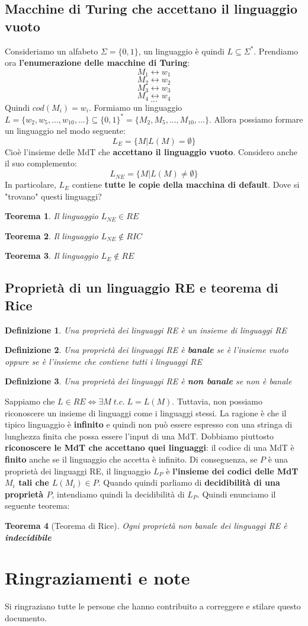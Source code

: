 \documentclass[12pt]{article}
\newtheorem{Definizione}{Definizione}[subsection]
\newtheorem{Teorema}{Teorema}[subsection]
\begin{document}
\subsection{Macchine di Turing che accettano il linguaggio vuoto}
Consideriamo un alfabeto $\Sigma = \{0, 1\}$, un linguaggio è quindi $L \subseteq \Sigma^*$. Prendiamo ora \textbf{l'enumerazione delle macchine di Turing}:
$$M_1 \leftrightarrow w_1$$
$$M_2 \leftrightarrow w_2$$
$$M_3 \leftrightarrow w_3$$
$$M_4 \leftrightarrow w_4$$
$$...$$
Quindi $cod(M_i) = w_i$. Formiamo un linguaggio $L = \{w_2, w_5, ..., w_10, ...\} \subseteq \{0, 1\}^* = \{M_2, M_5, ..., M_10, ...\}$. Allora possiamo formare un linguaggio nel modo seguente:
$$L_E = \{M|L(M) = \emptyset\}$$
Cioè l'insieme delle MdT che \textbf{accettano il linguaggio vuoto}. Considero anche il suo complemento:
$$L_{NE} = \{M|L(M) \neq \emptyset\}$$
In particolare, $L_E$ contiene \textbf{tutte le copie della macchina di default}. Dove si "trovano" questi linguaggi?
\begin{Teorema}
    Il linguaggio $L_{NE} \in RE$
\end{Teorema}
\begin{Teorema}
    Il linguaggio $L_{NE} \not \in RIC$
\end{Teorema}
\begin{Teorema}
    Il linguaggio $L_E \not\in RE$
\end{Teorema}
\subsection{Proprietà di un linguaggio RE e teorema di Rice}
\begin{Definizione}
    Una proprietà dei linguaggi RE è un insieme di linguaggi RE
\end{Definizione}
\begin{Definizione}
    Una proprietà dei linguaggi RE è \textbf{banale} se è l'insieme vuoto oppure se è l'insieme che contiene tutti i linguaggi RE
\end{Definizione}
\begin{Definizione}
    Una proprietà dei linguaggi RE è \textbf{non banale} se non è banale
\end{Definizione}
Sappiamo che $L \in RE \Leftrightarrow \exists M \; t.c. \; L = L(M)$. Tuttavia, non possiamo riconoscere un insieme di linguaggi come i linguaggi stessi. La ragione è che il tipico linguaggio è \textbf{infinito} e quindi non può essere espresso con una stringa di lunghezza finita che possa essere l'input di una MdT. Dobbiamo piuttosto \textbf{riconoscere le MdT che accettano quei linguaggi}: il codice di una MdT è \textbf{finito} anche se il linguaggio che accetta è infinito. Di conseguenza, se $P$ è una proprietà dei linguaggi RE, il linguaggio $L_P$ è \textbf{l'insieme dei codici delle MdT $M_i$ tali che $L(M_i) \in P$}. Quando quindi parliamo di \textbf{decidibilità di una proprietà $P$}, intendiamo quindi la decidibilità di $L_P$. Quindi enunciamo il seguente teorema:
\begin{Teorema}[Teorema di Rice]
Ogni proprietà non banale dei linguaggi RE è \textbf{indecidibile}
\end{Teorema}
\section{Ringraziamenti e note}
Si ringraziano tutte le persone che hanno contribuito a correggere e stilare questo \newline documento.
\end{document}
